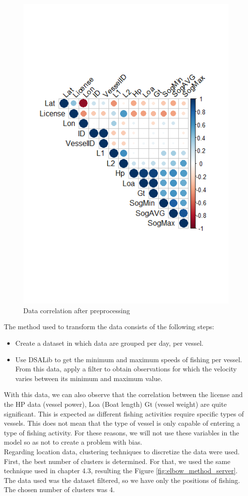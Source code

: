 \begin{figure}
\centering
\includegraphics[width=0.7\linewidth]{Chapters/img/data_coor2.png}
\caption{Data correlation after preprocessing}
\label{fig:data_coor2}
\end{figure}
\newpage
The method used to transform the data consists of the following steps:
\begin{itemize}
\item Create a dataset in which data are grouped per day, per vessel.
\item Use DSALib to get the minimum and maximum speeds of fishing per vessel. From this data, apply a filter to obtain observations for which the velocity varies between its minimum and maximum value.

\end{itemize}

With this data, we can also observe that the correlation between the license and the HP data (vessel power), Loa (Boat length) Gt (vessel weight) are quite significant. This is expected as different fishing activities require specific types of vessels. This does not mean that the type of vessel is only capable of entering a type of fishing activity.
For these reasons, we will not use these variables in the model so as not to create a problem with bias.
\\
Regarding location data, clustering techniques to discretize the data were used.
First, the best number of clusters is determined. For that, we used the same technique used in chapter 4.3, resulting the Figure \ref{fig:elbow_method_server}. The data used was the dataset filtered, so we have only the positions of fishing. The chosen number of clusters was 4.

